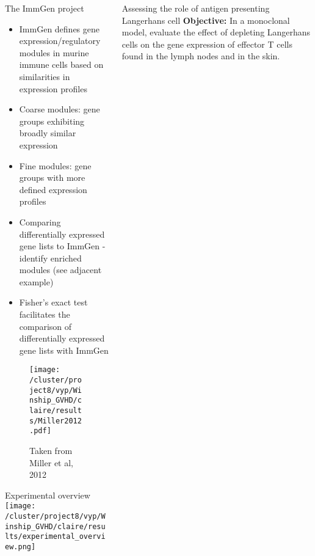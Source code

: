 \documentclass[final,hyperref={pdfpagelabels=false}]{beamer}
\begin{document}
\begin{frame}{}
\begin{columns}[t]
\begin{column}{.26\linewidth}
    \begin{block}{The ImmGen project}
\begin{minipage}{0.45\textwidth}
 {\small     \begin{itemize}
      \item ImmGen defines gene expression/regulatory modules in murine immune cells based on similarities in expression profiles 
      \item Coarse modules: gene groups exhibiting broadly similar expression 
	\item Fine modules: gene groups with more defined expression profiles
\item Comparing differentially expressed gene lists to ImmGen - identify enriched modules (see adjacent example)
      \item Fisher's exact test facilitates the comparison of differentially expressed gene lists with ImmGen
      \end{itemize}}
\end{minipage}
\begin{minipage}{0.45\textwidth}
\begin{figure}[!thb]
   \texttt{[image: /cluster/project8/vyp/Winship\_GVHD/claire/results/Miller2012.pdf]}
   \caption{Taken from Miller et al, 2012}
\end{figure}
\end{minipage}
    \end{block}

\begin{block}{Experimental overview}
  \texttt{[image: /cluster/project8/vyp/Winship\_GVHD/claire/results/experimental\_overview.png]}
\end{block}
  \end{column}



  \begin{column}{.36\linewidth}
    \begin{block}{Assessing the role of antigen presenting Langerhans cell}
  {\bf Objective:} In a monoclonal model, evaluate the effect of depleting Langerhans cells on the gene expression of effector T cells found in the lymph nodes and in the skin.



\end{block}
\end{column}
\end{columns}
\end{frame}
\end{document}
